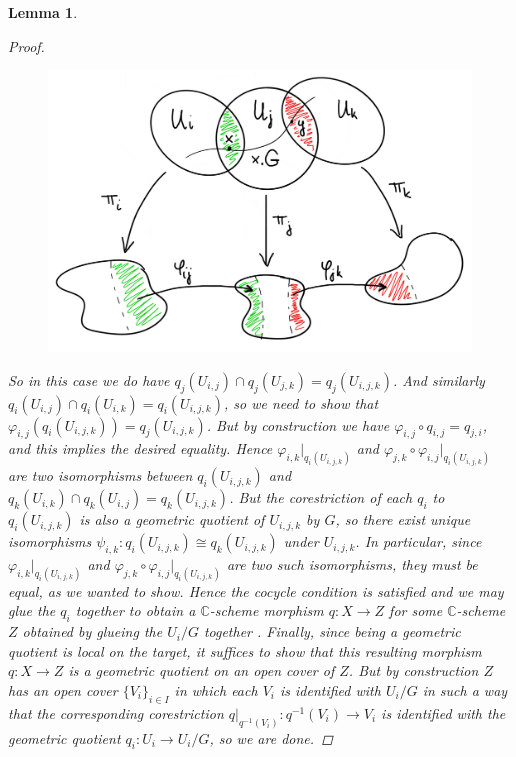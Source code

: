 \documentclass[12pt,a4paper]{amsart}
\theoremstyle{plain}
\newtheorem{lm}[thm]{Lemma}
\theoremstyle{definition}
\theoremstyle{remark}
\begin{document}
\begin{lm}
\begin{proof}
    \begin{figure}[H]
      \centering
      \includegraphics[scale=.75]{pictures/glueing.png}
    \end{figure}

    So in this case we do have $q_{j}(U_{i,j}) \cap q_{j}(U_{j,k}) = q_{j}(U_{i,j,k})$.
    And similarly $q_{i}(U_{i,j}) \cap q_{i}(U_{i,k}) = q_{i}(U_{i,j,k})$, so we need to show that $\varphi_{i,j}(q_{i}(U_{i,j,k})) = q_{j}(U_{i,j,k})$.
    But by construction we have $\varphi_{i,j} \circ q_{i,j} = q_{j,i}$, and this implies the desired equality.
    Hence $\varphi_{i,k}|_{q_{i}(U_{i,j,k})}$ and $\varphi_{j,k} \circ \varphi_{i,j}|_{q_{i}(U_{i,j,k})}$ are two isomorphisms between $q_{i}(U_{i,j,k})$ and $q_{k}(U_{i,k}) \cap q_{k}(U_{i,j}) = q_{k}(U_{i,j,k})$.
    But the corestriction of each $q_{i}$ to $q_{i}(U_{i,j,k})$ is also a geometric quotient of $U_{i,j,k}$ by $G$, so there exist unique isomorphisms $\psi_{i,k} \colon q_{i}(U_{i,j,k}) \cong q_{k}(U_{i,j,k})$ under $U_{i,j,k}$.
    In particular, since $\varphi_{i,k}|_{q_{i}(U_{i,j,k})}$ and $\varphi_{j,k} \circ \varphi_{i,j}|_{q_{i}(U_{i,j,k})}$ are two such isomorphisms, they must be equal, as we wanted to show.
    Hence the cocycle condition is satisfied and we may glue the $q_{i}$ together to obtain a $\mathbb{C}$-scheme morphism $q \colon X \to Z$ for some $\mathbb{C}$-scheme $Z$ obtained by glueing the $U_{i}/G$ together \cite[Exercise II.2.12]{har77}.
    Finally, since being a geometric quotient is local on the target, it suffices to show that this resulting morphism $q \colon X \to Z$ is a geometric quotient on an open cover of $Z$.
    But by construction $Z$ has an open cover $\{ V_{i} \}_{i \in I}$ in which each $V_{i}$ is identified with $U_{i}/G$ in such a way that the corresponding corestriction $q|_{q^{-1}(V_{i})} \colon q^{-1}(V_{i}) \to V_{i}$ is identified with the geometric quotient $q_{i} \colon U_{i} \to U_{i}/G$, so we are done.
  \end{proof}
\end{lm}
\end{document}
